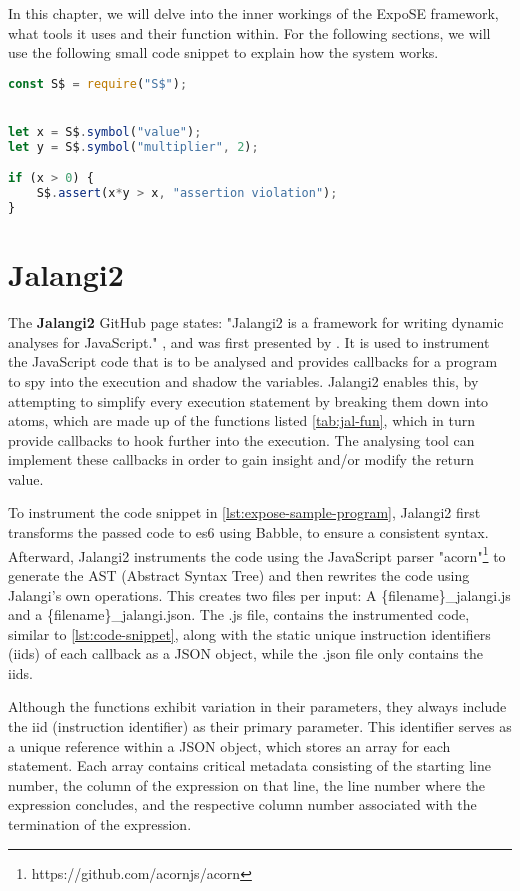 In this chapter, we will delve into the inner workings of the ExpoSE framework, what tools it uses and their function within. 
For the following sections, we will use the following small code snippet to explain how the system works. 


\begin{lstlisting}[language=JavaScript,float, caption={A simple program for ExpoSE}, label={lst:expose-sample-program}]
const S$ = require("S$");


let x = S$.symbol("value"); 
let y = S$.symbol("multiplier", 2);

if (x > 0) {
    S$.assert(x*y > x, "assertion violation"); 
}


\end{lstlisting}




\section{Jalangi2}
\label{sec:jalangi}
The \textbf{Jalangi2} GitHub page \cite{noauthor_samsungjalangi2_nodate} states: "Jalangi2 is a framework for writing dynamic analyses for JavaScript." , and was first presented by \citet{sen_jalangi_2013}. It is used to instrument the JavaScript code that is to be analysed and provides callbacks for a program to spy into the execution and shadow the variables.
Jalangi2 enables this, by attempting to simplify every execution statement by breaking them down into atoms, which are made up of the functions listed \autoref{tab:jal-fun}, which in turn provide callbacks to hook further into the execution.
The analysing tool can implement these callbacks in order to gain insight and/or modify the return value.


To instrument the code snippet in \autoref{lst:expose-sample-program}, Jalangi2 first transforms the passed code to es6 using Babble, to ensure a consistent syntax. 
Afterward, Jalangi2 instruments the code using the JavaScript parser "acorn"\footnote{https://github.com/acornjs/acorn} to generate the AST (Abstract Syntax Tree) and then rewrites the code using Jalangi's own operations. This creates two files per input: 
A \{filename\}\_jalangi.js and a \{filename\}\_jalangi.json. The .js file, contains the instrumented code, similar to \autoref{lst:code-snippet}, along with the static unique instruction identifiers (iids) of each callback as a JSON object, while the .json file only contains the iids.

Although the functions exhibit variation in their parameters, they always include the iid (instruction identifier) as their primary parameter. This identifier serves as a unique reference within a JSON object, which stores an array for each statement. Each array contains critical metadata consisting of the starting line number, the column of the expression on that line, the line number where the expression concludes, and the respective column number associated with the termination of the expression.



